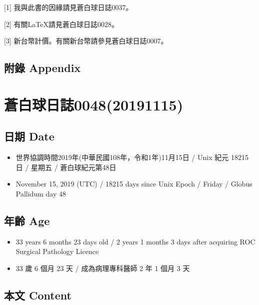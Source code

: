 \documentclass[a5paper, 12pt
]{book}
\providecommand{\tightlist}{%
  \setlength{\itemsep}{0pt}\setlength{\parskip}{0pt}}
\begin{document}
{[}1{]} 我與此書的因緣請見蒼白球日誌0037。

{[}2{]} 有關LaTeX請見蒼白球日誌0028。

{[}3{]} 新台幣計價。有關新台幣請參見蒼白球日誌0007。

\hypertarget{ux9644ux9304-appendix-39}{%
\subsection{附錄 Appendix}\label{ux9644ux9304-appendix-39}}

\hypertarget{ux84bcux767dux7403ux65e5ux8a8c004820191115}{%
\section{蒼白球日誌0048(20191115)}\label{ux84bcux767dux7403ux65e5ux8a8c004820191115}}

\hypertarget{ux65e5ux671f-date-47}{%
\subsection{日期 Date}\label{ux65e5ux671f-date-47}}

\begin{itemize}
\tightlist
\item
  世界協調時間2019年(中華民國108年，令和1年)11月15日 / Unix 紀元 18215
  日 / 星期五 / 蒼白球紀元第48日
\item
  November 15, 2019 (UTC) / 18215 days since Unix Epoch / Friday /
  Globus Pallidum day 48
\end{itemize}

\hypertarget{ux5e74ux9f61-age-47}{%
\subsection{年齡 Age}\label{ux5e74ux9f61-age-47}}

\begin{itemize}
\tightlist
\item
  33 years 6 months 23 days old / 2 years 1 months 3 days after
  acquiring ROC Surgical Pathology Licence
\item
  33 歲 6 個月 23 天 / 成為病理專科醫師 2 年 1 個月 3 天
\end{itemize}

\hypertarget{ux672cux6587-content-47}{%
\subsection{本文 Content}\label{ux672cux6587-content-47}}
\end{document}
